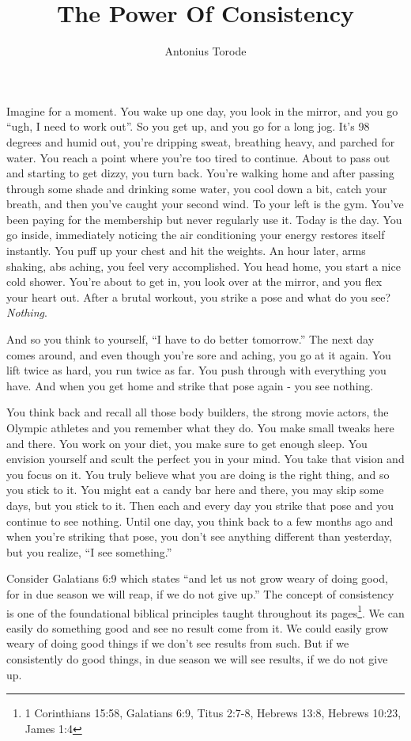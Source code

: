 \documentclass[11pt]{article}
\title{The Power Of Consistency}
\author{Antonius Torode}
\begin{document}
\maketitle
\thispagestyle{fancy}

\begin{multicols}{2}
Imagine for a moment. You wake up one day, you look in the mirror, and you go ``ugh, I need to work out''. So you get up, and you go for a long jog. It's 98 degrees and humid out, you're dripping sweat, breathing heavy, and parched for water. You reach a point where you're too tired to continue. About to pass out and starting to get dizzy, you turn back. You're walking home and after passing through some shade and drinking some water, you cool down a bit, catch your breath, and then you've caught your second wind. To your left is the gym. You've been paying for the membership but never regularly use it. Today is the day. You go inside, immediately noticing the air conditioning your energy restores itself instantly. You puff up your chest and hit the weights. An hour later, arms shaking, abs aching, you feel very accomplished. You head home, you start a nice cold shower. You're about to get in, you look over at the mirror, and you flex your heart out. After a brutal workout, you strike a pose and what do you see? \textit{Nothing}.

And so you think to yourself, ``I have to do better tomorrow.'' The next day comes around, and even though you're sore and aching, you go at it again. You lift twice as hard, you run twice as far. You push through with everything you have. And when you get home and strike that pose again - you see nothing.

You think back and recall all those body builders, the strong movie actors, the Olympic athletes and you remember what they do. You make small tweaks here and there. You work on your diet, you make sure to get enough sleep. You envision yourself and scult the perfect you in your mind. You take that vision and you focus on it. You truly believe what you are doing is the right thing, and so you stick to it. You might eat a candy bar here and there, you may skip some days, but you stick to it. Then each and every day you strike that pose and you continue to see nothing. Until one day, you think back to a few months ago and when you're striking that pose, you don't see anything different than yesterday, but you realize, ``I see something.''

Consider Galatians 6:9 which states ``and let us not grow weary of doing good, for in due season we will reap, if we do not give up.'' The concept of consistency is one of the foundational biblical principles taught throughout its pages\footnote{1 Corinthians 15:58, Galatians 6:9, Titus 2:7-8, Hebrews 13:8, Hebrews 10:23, James 1:4}. We can easily do something good and see no result come from it. We could easily grow weary of doing good things if we don't see results from such. But if we consistently do good things, in due season we will see results, if we do not give up.


\end{multicols}
\end{document}
